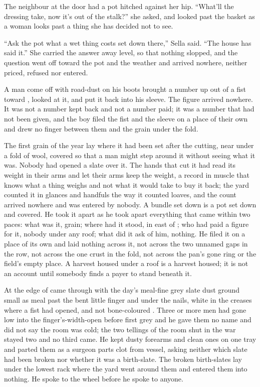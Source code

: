 The neighbour at the door had a pot hitched against her hip. “What'll the dressing take, now it's out of the stalk?” she asked, and looked past the basket as a woman looks past a thing she has decided not to see.

“Ask the pot what a wet thing costs set down there,” Sella said. “The house has said it.” She carried the answer away level, so that nothing slopped, and the question went off toward the pot and the weather and arrived nowhere, neither priced, refused nor entered.

A man come off  with road-dust on his boots brought a number up out of a fist toward , looked at it, and put it back into his sleeve. The figure arrived nowhere. It was not a number kept back and not a number paid; it was a number that had not been given, and the boy filed the fist and the sleeve on a place of their own and drew no finger between them and the grain under the fold.

The first grain of the year lay where it had been set after the cutting, near  under a fold of wool, covered so that a man might step around it without seeing what it was. Nobody had opened a slate over it. The hands that cut it had read its weight in their arms and let their arms keep the weight, a record in muscle that knows what a thing weighs and not what it would take to buy it back; the yard counted it in glances and handfuls the way it counted loaves, and the count arrived nowhere and was entered by nobody. A bundle set down is a pot set down and covered. He took it apart as he took apart everything that came within two paces: what was it, grain; where had it stood, in  east of ; who had paid a figure for it, nobody under any roof; what did it ask of him, nothing. He filed it on a place of its own and laid nothing across it, not across the two unnamed gaps in the row, not across the one crust in the fold, not across the pan's gone ring or the field's empty place. A harvest housed under a roof is a harvest housed; it is not an account until somebody finds a payer to stand beneath it.

\scenebreak

At the edge of   came through with the day's meal-fine grey slate dust ground small as meal past the bent little finger and under the nails, white in the creases where a fist had opened, and not bone-coloured . Three or more men had gone low into the finger's-width-open  before first grey and he gave them no name and did not say the room was cold; the two tellings of the room shut in the war stayed two and no third came. He kept dusty forearms and clean ones on one tray and parted them as a surgeon parts clot from vessel, asking neither which slate had been broken nor whether it was a birth-slate. The broken birth-slates lay under the lowest rack where the yard went around them and entered them into nothing. He spoke to the wheel before he spoke to anyone.

